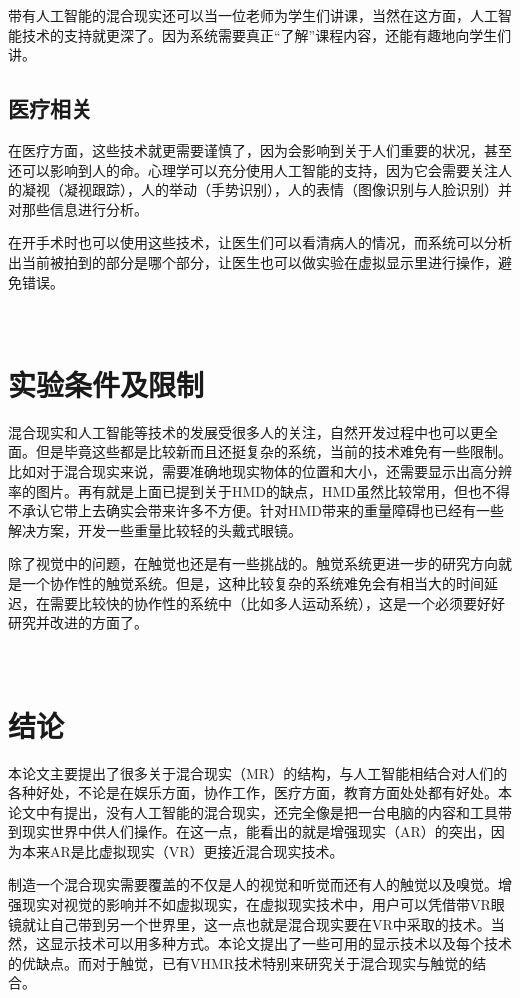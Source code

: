 \documentclass{llncs}
\begin{document}
带有人工智能的混合现实还可以当一位老师为学生们讲课，当然在这方面，人工智能技术的支持就更深了。因为系统需要真正“了解”课程内容，还能有趣地向学生们讲。

\subsection{医疗相关}
在医疗方面，这些技术就更需要谨慎了，因为会影响到关于人们重要的状况，甚至还可以影响到人的命。心理学可以充分使用人工智能的支持，因为它会需要关注人的凝视（凝视跟踪），人的举动（手势识别），人的表情（图像识别与人脸识别）并对那些信息进行分析。

在开手术时也可以使用这些技术，让医生们可以看清病人的情况\cite{azuma2001recent}，而系统可以分析出当前被拍到的部分是哪个部分，让医生也可以做实验在虚拟显示里进行操作，避免错误。

\

\section{实验条件及限制}
混合现实和人工智能等技术的发展受很多人的关注，自然开发过程中也可以更全面。但是毕竟这些都是比较新而且还挺复杂的系统，当前的技术难免有一些限制。比如对于混合现实来说，需要准确地现实物体的位置和大小，还需要显示出高分辨率的图片\cite{costanza2009mixed}。再有就是上面已提到关于HMD的缺点，HMD虽然比较常用，但也不得不承认它带上去确实会带来许多不方便。针对HMD带来的重量障碍也已经有一些解决方案，开发一些重量比较轻的头戴式眼镜\cite{DBLP:conf/egve/PeternierVT06}。

除了视觉中的问题，在触觉也还是有一些挑战的。触觉系统更进一步的研究方向就是一个协作性的触觉系统。但是，这种比较复杂的系统难免会有相当大的时间延迟，在需要比较快的协作性的系统中（比如多人运动系统\cite{DBLP:conf/ACMace/KnoerleinSH07}），这是一个必须要好好研究并改进的方面了。

\
\section{结论}
本论文主要提出了很多关于混合现实（MR）的结构，与人工智能相结合对人们的各种好处，不论是在娱乐方面，协作工作，医疗方面，教育方面处处都有好处。本论文中有提出，没有人工智能的混合现实，还完全像是把一台电脑的内容和工具带到现实世界中供人们操作。在这一点，能看出的就是增强现实（AR）的突出，因为本来AR是比虚拟现实（VR）更接近混合现实技术。

制造一个混合现实需要覆盖的不仅是人的视觉和听觉而还有人的触觉以及嗅觉。增强现实对视觉的影响并不如虚拟现实，在虚拟现实技术中，用户可以凭借带VR眼镜就让自己带到另一个世界里，这一点也就是混合现实要在VR中采取的技术。当然，这显示技术可以用多种方式。本论文提出了一些可用的显示技术以及每个技术的优缺点。而对于触觉，已有VHMR技术特别来研究关于混合现实与触觉的结合。
\end{document}
